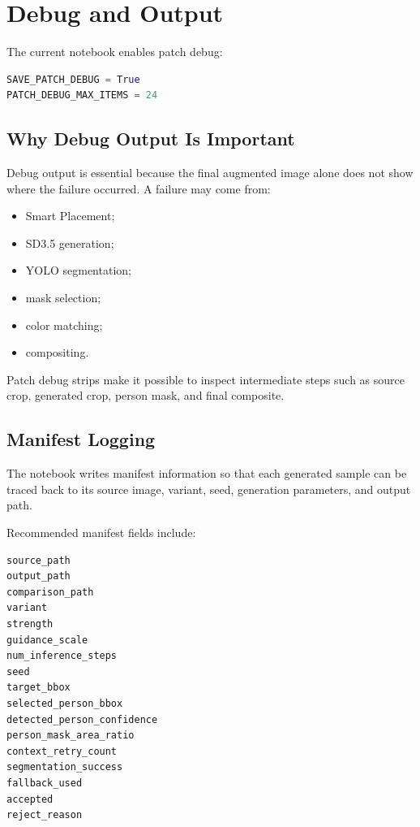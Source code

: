 \documentclass[12pt,a4paper]{article}
\begin{document}
\section{Debug and Output}

The current notebook enables patch debug:

\begin{lstlisting}[language=Python,caption={Current debug settings}]
SAVE_PATCH_DEBUG = True
PATCH_DEBUG_MAX_ITEMS = 24
\end{lstlisting}

\subsection{Why Debug Output Is Important}

Debug output is essential because the final augmented image alone does not show
where the failure occurred. A failure may come from:

\begin{itemize}
    \item Smart Placement;
    \item SD3.5 generation;
    \item YOLO segmentation;
    \item mask selection;
    \item color matching;
    \item compositing.
\end{itemize}

Patch debug strips make it possible to inspect intermediate steps such as source
crop, generated crop, person mask, and final composite.

\subsection{Manifest Logging}

The notebook writes manifest information so that each generated sample can be
traced back to its source image, variant, seed, generation parameters, and output
path.

Recommended manifest fields include:

\begin{lstlisting}[language={},caption={Recommended manifest columns}]
source_path
output_path
comparison_path
variant
strength
guidance_scale
num_inference_steps
seed
target_bbox
selected_person_bbox
detected_person_confidence
person_mask_area_ratio
context_retry_count
segmentation_success
fallback_used
accepted
reject_reason
\end{lstlisting}
\end{document}
